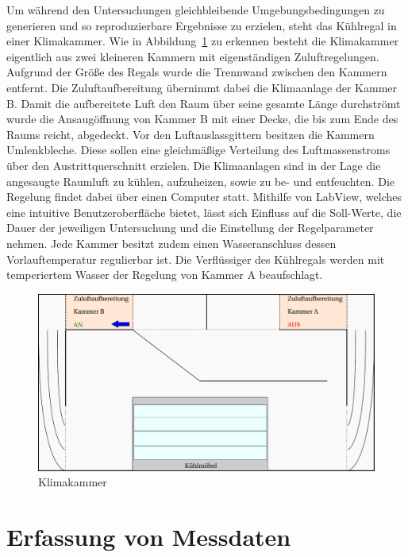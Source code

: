 Um während den Untersuchungen gleichbleibende Umgebungsbedingungen zu generieren und so reproduzierbare Ergebnisse zu erzielen, steht das Kühlregal in einer Klimakammer.
Wie in Abbildung~\ref{fig:Klimakammer} zu erkennen besteht die Klimakammer eigentlich aus zwei kleineren Kammern mit eigenständigen Zuluftregelungen. Aufgrund der Größe des Regals wurde die Trennwand zwischen den Kammern entfernt. Die Zuluftaufbereitung übernimmt dabei die Klimaanlage der Kammer B. Damit die aufbereitete Luft den Raum über seine gesamte Länge durchströmt wurde die Ansaugöffnung von Kammer B mit einer Decke, die bis zum Ende des Raums reicht, abgedeckt. Vor den Luftauslassgittern besitzen die Kammern Umlenkbleche. Diese sollen eine gleichmäßige Verteilung des Luftmassenstroms über den Austrittquerschnitt erzielen. Die Klimaanlagen sind in der Lage die angesaugte Raumluft zu kühlen, aufzuheizen, sowie zu be- und entfeuchten. Die Regelung findet dabei über einen Computer statt. Mithilfe von LabView, welches eine intuitive Benutzeroberfläche bietet, lässt sich Einfluss auf die Soll-Werte, die Dauer der jeweiligen Untersuchung und die Einstellung der Regelparameter nehmen. 
Jede Kammer besitzt zudem einen Wasseranschluss dessen Vorlauftemperatur regulierbar ist.
Die Verflüssiger des Kühlregals werden mit temperiertem Wasser der Regelung von Kammer A beaufschlagt. 


\begin{figure}[htb]
\centering
\includegraphics[scale=.5]{Pictures/ClimateChamber.pdf}
\caption{Klimakammer}
\label{fig:Klimakammer}
\end{figure}

\section{Erfassung von Messdaten}
\label{sec:Erfassung von Messdaten}


